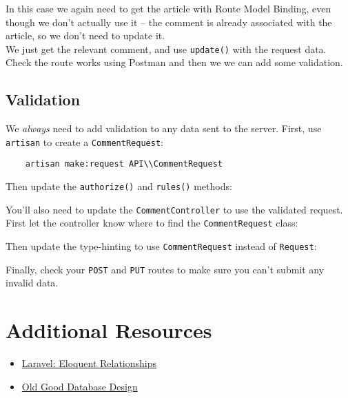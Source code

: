 In this case we again need to get the article with Route Model Binding, even though we don't actually use it – the comment is already associated with the article, so we don't need to update it.
\\

We just get the relevant comment, and use \texttt{update()} with the request data.
\\

Check the route works using Postman and then we we can add some validation.


\subsection{Validation}

We \textit{always} need to add validation to any data sent to the server. First, use \texttt{artisan} to create a \texttt{CommentRequest}:

\begin{verbatim}
    artisan make:request API\\CommentRequest
\end{verbatim}

Then update the \texttt{authorize()} and \texttt{rules()} methods:


You'll also need to update the \texttt{CommentController} to use the validated request. First let the controller know where to find the \texttt{CommentRequest} class:


Then update the type-hinting to use \texttt{CommentRequest} instead of \texttt{Request}:


Finally, check your \texttt{POST} and \texttt{PUT} routes to make sure you can't submit any invalid data.


\section{Additional Resources}

\begin{itemize}[leftmargin=*]
    \item \href{http://laravel.com/docs/7.x/eloquent-relationships}{Laravel: Eloquent Relationships}
    \item \href{https://relinx.io/2020/09/14/old-good-database-design}{Old Good Database Design}
\end{itemize}
